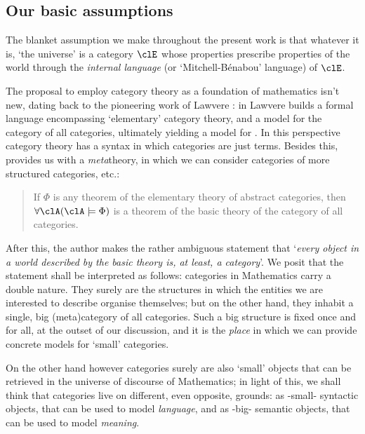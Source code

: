 
\subsection{Our basic assumptions}

The blanket assumption we make throughout the present work is that whatever it is, `the universe' is a category $\clE$ whose properties prescribe properties of the world through the \emph{internal language} (or `Mitchell-Bénabou' language) of $\clE$. 

The proposal to employ category theory as a foundation of mathematics isn't new, dating back to the pioneering work of Lawvere \cite{lawvere1964elementary,lajolla,lawvere1969adjointness,lawvere1963functorial}: in \cite{lajolla} Lawvere builds a formal language  encompassing `elementary' category theory, and a model  for the category of all categories, ultimately yielding a model for . In this perspective category theory has a syntax in which categories are just terms. Besides this,  provides us with a \emph{meta}theory, in which we can consider categories of more structured categories, etc.:
\begin{quote}
	If $\Phi$ is any theorem of the elementary theory of abstract categories, then $\forall \clA (\clA \models \Phi)$ is a theorem of the basic theory of the category of all categories. \hfill \cite{lajolla}
\end{quote}
After this, the author makes the rather ambiguous statement that `\textit{every object in a world described by the basic theory is, at least, a category}'. We posit that the statement shall be interpreted as follows: categories in Mathematics carry a double nature. They surely are the structures in which the entities we are interested to describe organise themselves; but on the other hand, they inhabit a single, big (meta)category of all categories. Such a big structure is fixed once and for all, at the outset of our discussion, and it is the \emph{place} in which we can provide concrete models for `small' categories.

On the other hand however categories surely are also `small' objects that can be retrieved in the universe of discourse of Mathematics; in light of this, we shall think that categories live on different, even opposite, grounds: as -small- syntactic objects, that can be used to model \emph{language}, and as -big- semantic objects, that can be used to model \emph{meaning}. 

